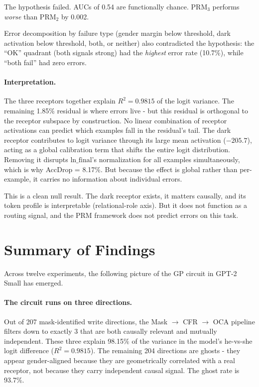\documentclass[11pt,a4paper]{article}
\begin{document}
The hypothesis failed. AUCs of 0.54 are functionally chance. PRM$_3$ performs \emph{worse} than PRM$_2$ by 0.002.

Error decomposition by failure type (gender margin below threshold, dark activation below threshold, both, or neither) also contradicted the hypothesis: the ``OK'' quadrant (both signals strong) had the \emph{highest} error rate (10.7\%), while ``both fail'' had zero errors.

\paragraph{Interpretation.} The three receptors together explain $R^2 = 0.9815$ of the logit variance. The remaining 1.85\% residual is where errors live - but this residual is orthogonal to the receptor subspace by construction. No linear combination of receptor activations can predict which examples fall in the residual's tail. The dark receptor contributes to logit variance through its large mean activation ($-205.7$), acting as a global calibration term that shifts the entire logit distribution. Removing it disrupts $\text{ln\_final}$'s normalization for all examples simultaneously, which is why AccDrop = 8.17\%. But because the effect is global rather than per-example, it carries no information about individual errors.

This is a clean null result. The dark receptor exists, it matters causally, and its token profile is interpretable (relational-role axis). But it does not function as a routing signal, and the PRM framework does not predict errors on this task.


\section{Summary of Findings}
\label{sec:summary}

Across twelve experiments, the following picture of the GP circuit in GPT-2 Small has emerged.

\paragraph{The circuit runs on three directions.} Out of 207 mask-identified write directions, the Mask $\to$ CFR $\to$ OCA pipeline filters down to exactly 3 that are both causally relevant and mutually independent. These three explain 98.15\% of the variance in the model's he-vs-she logit difference ($R^2 = 0.9815$). The remaining 204 directions are ghosts - they appear gender-aligned because they are geometrically correlated with a real receptor, not because they carry independent causal signal. The ghost rate is 93.7\%.
\end{document}
